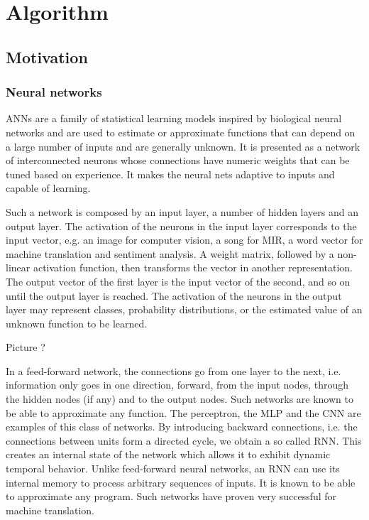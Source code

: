 \part{Algorithm} \label{part:algorithm}

\chapter{Motivation} \label{chap:motivation}

\section{Neural networks}

\gls{ANNs} are a family of statistical learning models inspired by biological neural networks and are used to estimate or approximate functions that can depend on a large number of inputs and are generally unknown. It is presented as a network of interconnected neurons whose connections have numeric weights that can be tuned based on experience. It makes the neural nets adaptive to inputs and capable of learning.

Such a network is composed by an input layer, a number of hidden layers and an output layer. The activation of the neurons in the input layer corresponds to the input vector, e.g. an image for computer vision, a song for \gls{MIR}, a word vector for machine translation and sentiment analysis. A weight matrix, followed by a non-linear activation function, then transforms the vector in another representation. The output vector of the first layer is the input vector of the second, and so on until the output layer is reached. The activation of the neurons in the output layer may represent classes, probability distributions, or the estimated value of an unknown function to be learned.

{\color{red} Picture ?}

In a feed-forward network, the connections go from one layer to the next, i.e. information only goes in one direction, forward, from the input nodes, through the hidden nodes (if any) and to the output nodes. Such networks are known to be able to approximate any function. The perceptron, the \gls{MLP} and the \gls{CNN} are examples of this class of networks.
By introducing backward connections, i.e. the connections between units form a directed cycle, we obtain a so called \gls{RNN}. This creates an internal state of the network which allows it to exhibit dynamic temporal behavior. Unlike feed-forward neural networks, an \gls{RNN} can use its internal memory to process arbitrary sequences of inputs. It is known to be able to approximate any program. Such networks have proven very successful for machine translation.

